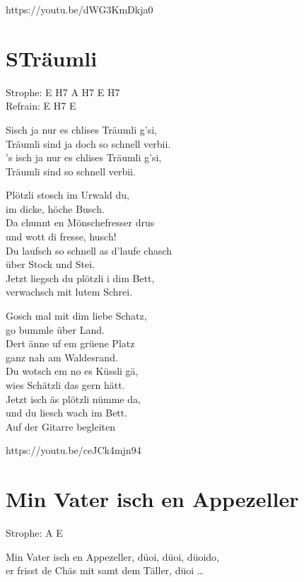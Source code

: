 \documentclass[
  letterpaper,
]{scrbook}
\begin{document}
https://youtu.be/dWG3KmDkja0

\hypertarget{struxe4umli}{%
\chapter{S\textquotesingle Träumli}\label{struxe4umli}}

Strophe: E H7 A H7 E H7\\
Refrain: E H7 E

S\textquotesingle isch ja nur es chlises Träumli g'si,\\
Träumli sind ja doch so schnell verbii.\\
's isch ja nur es chlises Träumli g'si,\\
Träumli sind so schnell verbii.

Plötzli stosch im Urwald du,\\
im dicke, höche Busch.\\
Da chunnt en Mönschefresser drus\\
und wott di fresse, husch!\\
Du laufsch so schnell as d'laufe chasch\\
über Stock und Stei.\\
Jetzt liegsch du plötzli i dim Bett,\\
verwachsch mit lutem Schrei.

Gosch mal mit dim liebe Schatz,\\
go bummle über Land.\\
Dert änne uf em grüene Platz\\
ganz nah am Waldesrand.\\
Du wotsch em no es Küssli gä,\\
wies Schätzli das gern hätt.\\
Jetzt isch äs plötzli nümme da,\\
und du liesch wach im Bett.\\
Auf der Gitarre begleiten

https://youtu.be/ceJCk4mjn94

\hypertarget{min-vater-isch-en-appezeller}{%
\chapter{Min Vater isch en
Appezeller}\label{min-vater-isch-en-appezeller}}

Strophe: A E

Min Vater isch en Appezeller, düoi, düoi, düoido,\\
er frisst de Chäs mit samt dem Täller, düoi \ldots{}
\end{document}
